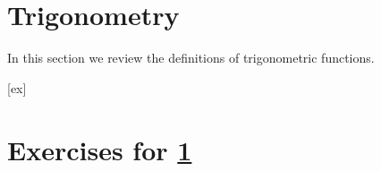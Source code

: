 \section{Trigonometry}\label{sec:Trigonometry}
In this section we review the definitions of trigonometric functions.








[ex]
\section*{Exercises for \ref{sec:Trigonometry}}


